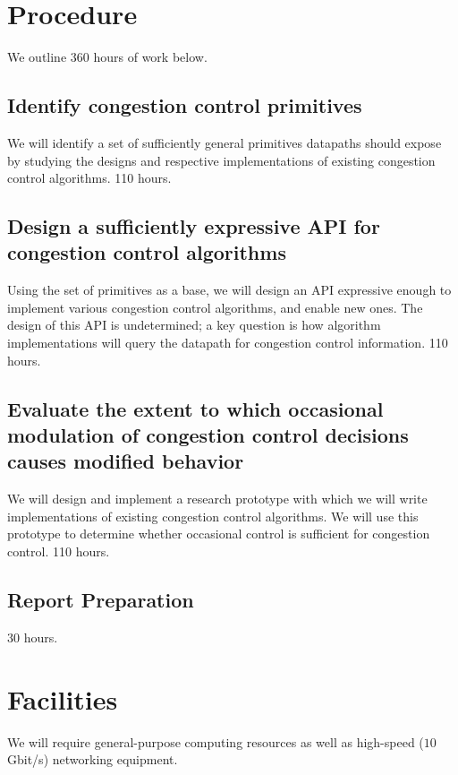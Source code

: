 \section{Procedure}%
\label{sec:procedure}

We outline 360 hours of work below.

\subsection{Identify congestion control primitives} 
We will identify a set of sufficiently general primitives datapaths should expose by studying the designs and respective implementations of existing congestion control algorithms. 110 hours.

\subsection{Design a sufficiently expressive API for congestion control algorithms}
Using the set of primitives as a base, we will design an API expressive enough to implement various congestion control algorithms, and enable new ones. The design of this API is undetermined; a key question is how algorithm implementations will query the datapath for congestion control information. 110 hours.

\subsection{Evaluate the extent to which occasional modulation of congestion control decisions causes modified behavior}
We will design and implement a research prototype with which we will write implementations of existing congestion control algorithms. We will use this prototype to determine whether occasional control is sufficient for congestion control. 110 hours.

\subsection{Report Preparation}
30 hours.

\section{Facilities}
\label{sec:facilities}

We will require general-purpose computing resources as well as high-speed (\eg $10$ Gbit/s) networking equipment.
